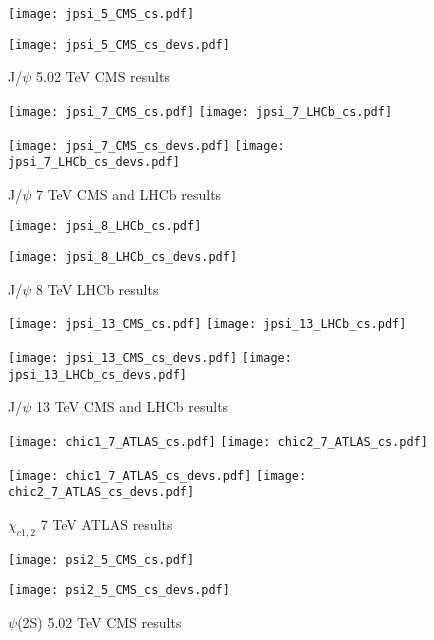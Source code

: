 \documentclass{article}
\begin{document}

\begin{figure}
\centering
\texttt{[image: jpsi\_5\_CMS\_cs.pdf]}

\texttt{[image: jpsi\_5\_CMS\_cs\_devs.pdf]}
\caption{J/$\psi$ 5.02 TeV CMS results}
\end{figure}

\clearpage

\begin{figure}
\centering
\texttt{[image: jpsi\_7\_CMS\_cs.pdf]}
\texttt{[image: jpsi\_7\_LHCb\_cs.pdf]}

\texttt{[image: jpsi\_7\_CMS\_cs\_devs.pdf]}
\texttt{[image: jpsi\_7\_LHCb\_cs\_devs.pdf]}
\caption{J/$\psi$ 7 TeV CMS and LHCb results}
\end{figure}

\clearpage

\begin{figure}
\centering
\texttt{[image: jpsi\_8\_LHCb\_cs.pdf]}

\texttt{[image: jpsi\_8\_LHCb\_cs\_devs.pdf]}
\caption{J/$\psi$ 8 TeV LHCb results}
\end{figure}

\clearpage

\begin{figure}
\centering
\texttt{[image: jpsi\_13\_CMS\_cs.pdf]}
\texttt{[image: jpsi\_13\_LHCb\_cs.pdf]}

\texttt{[image: jpsi\_13\_CMS\_cs\_devs.pdf]}
\texttt{[image: jpsi\_13\_LHCb\_cs\_devs.pdf]}
\caption{J/$\psi$ 13 TeV CMS and LHCb results}
\end{figure}

\clearpage

\begin{figure}
\centering
\texttt{[image: chic1\_7\_ATLAS\_cs.pdf]}
\texttt{[image: chic2\_7\_ATLAS\_cs.pdf]}

\texttt{[image: chic1\_7\_ATLAS\_cs\_devs.pdf]}
\texttt{[image: chic2\_7\_ATLAS\_cs\_devs.pdf]}
\caption{$\chi_{c1,2}$ 7 TeV ATLAS results}
\end{figure}

\clearpage

\begin{figure}
\centering
\texttt{[image: psi2\_5\_CMS\_cs.pdf]}

\texttt{[image: psi2\_5\_CMS\_cs\_devs.pdf]}
\caption{$\psi$(2S) 5.02 TeV CMS results}
\end{figure}
\end{document}
